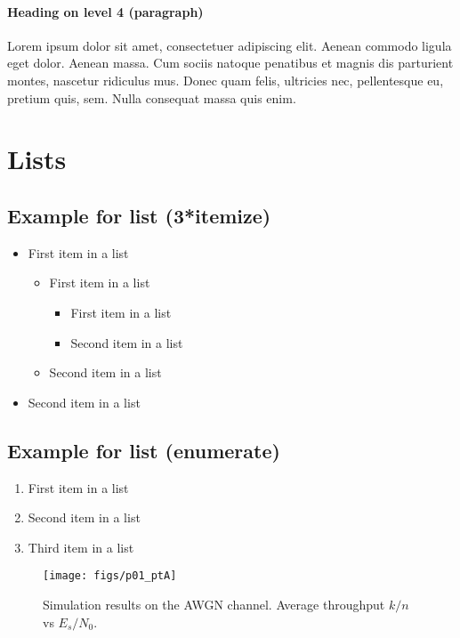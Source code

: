 \documentclass[paper=a4, fontsize=11pt]{scrartcl}
\numberwithin{equation}{section}		%
\numberwithin{figure}{section}			%
\numberwithin{table}{section}				%
\begin{document}
\paragraph{Heading on level 4 (paragraph)}
Lorem ipsum dolor sit amet, consectetuer adipiscing elit. Aenean commodo ligula eget dolor. Aenean massa. Cum sociis natoque penatibus et magnis dis parturient montes, nascetur ridiculus mus. Donec quam felis, ultricies nec, pellentesque eu, pretium quis, sem. Nulla consequat massa quis enim. 


\section{Lists}

\subsection{Example for list (3*itemize)}
\begin{itemize}
	\item First item in a list 
		\begin{itemize}
		\item First item in a list 
			\begin{itemize}
			\item First item in a list 
			\item Second item in a list 
			\end{itemize}
		\item Second item in a list 
		\end{itemize}
	\item Second item in a list 
\end{itemize}

\subsection{Example for list (enumerate)}
\begin{enumerate}
	\item First item in a list 
	\item Second item in a list 
	\item Third item in a list
\end{enumerate}





\pagebreak
\begin{figure}[!hbt]
	\begin{center}
		\texttt{[image: figs/p01\_ptA]}
		\caption{Simulation results on the AWGN channel. Average throughput $k/n$ vs $E_s/N_0$.}
		\label{fig:p01_ptA-test}
	\end{center}
\end{figure}
\end{document}

